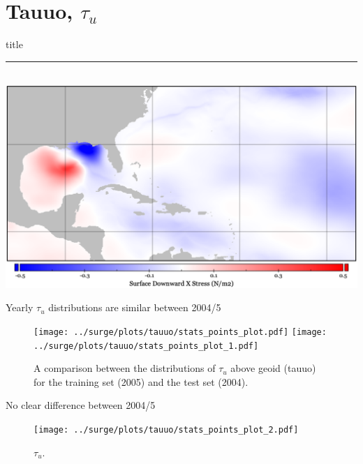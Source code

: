 \section{Tauuo, $\tau_u$ }
    \begin{frame}[plain]
        \vfill
      \centering
      \begin{beamercolorbox}[sep=8pt,center,shadow=true,rounded=true]{title}
        \insertsectionhead\par%
        \color{oxfordblue}\noindent\rule{10cm}{1pt} \\
                \includegraphics[width=0.93\linewidth]{images/tauuo.png}
      \end{beamercolorbox}
      \vfill
  \end{frame}

\begin{frame}{Yearly $\tau_u$ distributions are similar between 2004/5 }
\vspace{-20pt}
\begin{figure}[htb!]
    \centering
    \texttt{[image: ../surge/plots/tauuo/stats\_points\_plot.pdf]}
     \hspace{0pt} \texttt{[image: ../surge/plots/tauuo/stats\_points\_plot\_1.pdf]}
    \vspace{-7pt}
    \caption{A comparison between the distributions of $\tau_u$ above geoid (tauuo)
     for the training set (2005) and the test set (2004).}
    \label{fig:}
\end{figure}
\end{frame}


\begin{frame}{No clear difference between 2004/5  }
\vspace{-20pt}
\begin{figure}[htb!]
    \centering
    \texttt{[image: ../surge/plots/tauuo/stats\_points\_plot\_2.pdf]}
    \vspace{-7pt}
    \caption{$\tau_u$.}
    \label{fig:}
\end{figure}
\end{frame}

